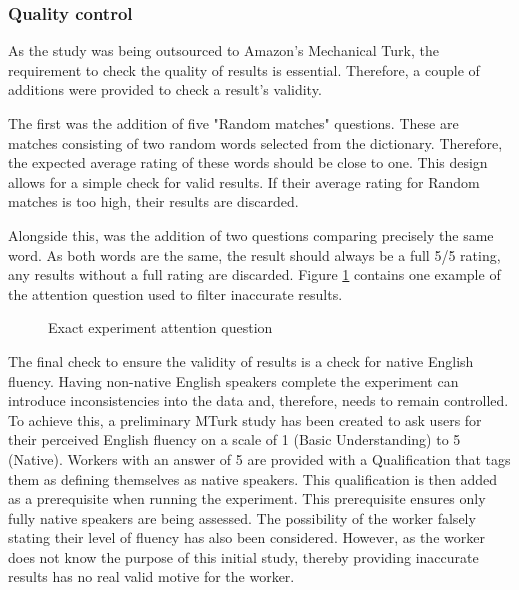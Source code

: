 \subsubsection*{Quality control}
\label{sec:exp1_qualitycontrol}
As the study was being outsourced to Amazon's Mechanical Turk, the requirement to check the quality of results is essential. Therefore, a couple of additions were provided to check a result's validity.

The first was the addition of five "Random matches" questions. These are matches consisting of two random words selected from the dictionary. Therefore, the expected average rating of these words should be close to one. This design allows for a simple check for valid results. If their average rating for Random matches is too high, their results are discarded.

Alongside this, was the addition of two questions comparing precisely the same word. As both words are the same, the result should always be a full 5/5 rating, any results without a full rating are discarded. Figure \ref{fig:exactMatch} contains one example of the attention question used to filter inaccurate results.

\begin{figure}[h!]
    \centering
    \begin{adjustbox}{width=0.5\textwidth,center}
    \end{adjustbox}
    \caption{Exact experiment attention question}
    \label{fig:exactMatch}
\end{figure}

The final check to ensure the validity of results is a check for native English fluency. Having non-native English speakers complete the 
experiment can introduce inconsistencies into the 
data and, therefore, needs to remain controlled. To achieve this, a preliminary MTurk study has been created to ask users for their perceived 
English fluency on a scale of 1 (Basic Understanding) to 5 (Native). 
Workers with an answer of 5 are provided with a 
Qualification
that tags them as defining themselves as native speakers. This qualification is then 
added as a prerequisite when running the experiment. This prerequisite ensures 
only fully native speakers are being assessed. The possibility of the 
worker falsely stating their level of fluency has also been considered. 
However, as the worker does not know the purpose of this initial study,
thereby providing inaccurate results has no real valid motive for the 
worker.

